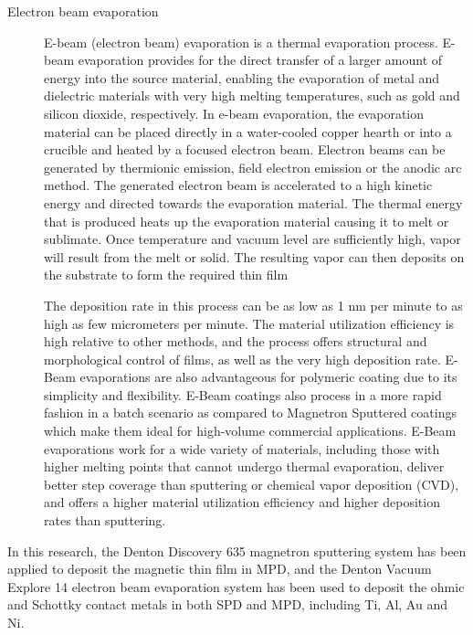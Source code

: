 \begin{description}

	\item[Electron beam evaporation] 
		
E-beam (electron beam) evaporation  is a thermal evaporation process. E-beam evaporation provides for the direct transfer of a larger amount of energy into the source material, enabling the evaporation of metal and dielectric materials with very high melting temperatures, such as gold and silicon dioxide, respectively.  In e-beam evaporation, the evaporation material can be placed directly in a water-cooled copper hearth or into a crucible and heated by a focused electron beam. Electron beams can be generated by thermionic emission, field electron emission or the anodic arc method. The generated electron beam is accelerated to a high kinetic energy and directed towards the evaporation material. The thermal energy that is produced heats up the evaporation material causing it to melt or sublimate. Once temperature and vacuum level are sufficiently high, vapor will result from the melt or solid. The resulting vapor can then deposits on the substrate to form the required thin film

The deposition rate in this process can be as low as 1 nm per minute to as high as few micrometers per minute. The material utilization efficiency is high relative to other methods, and the process offers structural and morphological control of films, as well as the very high deposition rate. E-Beam evaporations are also advantageous for polymeric coating due to its simplicity and flexibility. E-Beam coatings also process in a more rapid fashion in a batch scenario as compared to Magnetron Sputtered coatings which make them ideal for high-volume commercial applications. E-Beam evaporations work for a wide variety of materials, including those with higher melting points that cannot undergo thermal evaporation, deliver better step coverage than sputtering or chemical vapor deposition (CVD), and offers a higher material utilization efficiency and higher deposition rates than sputtering.
	
\end{description}

In this research, the Denton Discovery 635 magnetron sputtering system has been applied to deposit the magnetic thin film  in MPD, and the Denton Vacuum Explore 14 electron beam evaporation system has been used to deposit the ohmic and Schottky contact metals  in  both SPD and MPD, including Ti, Al, Au and Ni.


